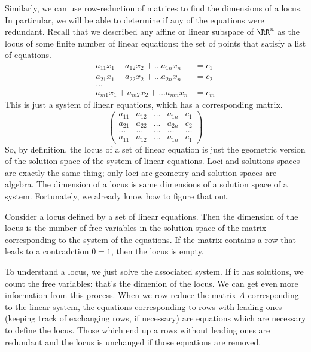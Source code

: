 \documentclass[fleqn]{report}
\begin{document}
Similarly, we can use row-reduction of matrices to find the
dimensions of a locus. In particular, we will be able to
determine if any of the equations were redundant. 
Recall that we described any affine or linear
subspace of $\RR^n$ as the locus of some finite number of
linear equations: the set of points
that satisfy a list of equations.
\begin{align*}
a_{11} x_1 + a_{12} x_2 + \ldots a_{1n} x_n & = c_1 \\
a_{21} x_1 + a_{22} x_2 + \ldots a_{2n} x_n & = c_2 \\
\ldots & \\
a_{m1} x_1 + a_{m2} x_2 + \ldots a_{mn} x_n & = c_m
\end{align*}
This is just a system of linear equations, which has a
corresponding matrix.
\begin{displaymath}
\left(
\begin{array}{cccc|c}
a_{11} & a_{12} & \ldots & a_{1n} & c_1 \\
a_{21} & a_{22} & \ldots & a_{2n} & c_2 \\
\ldots & \ldots & \ldots & \ldots & \ldots \\
a_{11} & a_{12} & \ldots & a_{1n} & c_1 
\end{array}
\right)
\end{displaymath}
So, by definition, the locus of a set of linear equation is just
the geometric version of the solution space of the system of linear
equations. Loci and solutions spaces are exactly the same
thing; only loci are geometry and solution
spaces are algebra. The dimension of a locus is same
dimensions of a solution space of a system. Fortunately, we
already know how to figure that out. 

\begin{prop}
Consider a locus defined by a set of linear equations. Then the
dimension of the locus is the number of free variables in the
solution space of the matrix corresponding to the
system of the equations. If the matrix contains a row
that leads to a contradction $0=1$, then the locus is empty.
\end{prop}

To understand a locus, we just solve the associated system.
If it has solutions, we count the free variables: that's the
dimenion of the locus. We can get even more information from
this process. When we row reduce the matrix $A$ corresponding
to the linear system, the equations corresponding to rows
with leading ones (keeping track of exchanging rows, if
necessary) are equations which are necessary to define the
locus. Those which end up a rows without leading ones are
redundant and the locus is unchanged if those equations are
removed.
\end{document}
